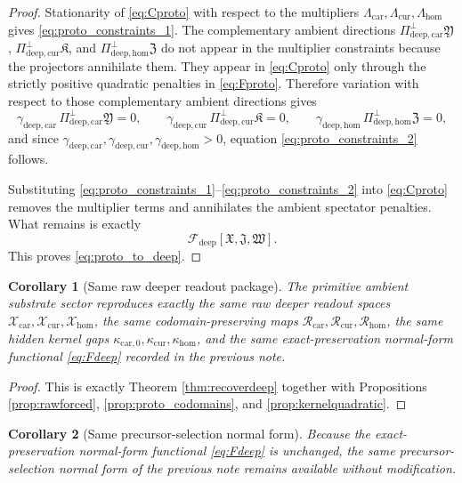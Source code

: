 \documentclass[11pt]{article}
\newcommand{\DeepFunctional}{\mathscr F_{\mathrm{deep}}}
\newcommand{\PreCarGap}{\kappa_{\mathrm{car},0}}
\newcommand{\CurrentGap}{\kappa_{\mathrm{cur}}}
\newcommand{\HomGap}{\kappa_{\mathrm{hom}}}
\newcommand{\DeepTensorClass}{\mathscr X_{\mathrm{car}}}
\newcommand{\DeepRelabelClass}{\mathscr X_{\mathrm{cur}}}
\newcommand{\DeepFreeClass}{\mathscr X_{\mathrm{hom}}}
\newcommand{\DeepTensor}{\mathfrak X}
\newcommand{\DeepRelabel}{\mathfrak J}
\newcommand{\DeepFree}{\mathfrak W}
\newcommand{\CarRead}{\mathcal R_{\mathrm{car}}}
\newcommand{\CurRead}{\mathcal R_{\mathrm{cur}}}
\newcommand{\HomRead}{\mathcal R_{\mathrm{hom}}}
\newcommand{\ProtoTensor}{\mathfrak Y}
\newcommand{\ProtoRelabel}{\mathfrak K}
\newcommand{\ProtoFree}{\mathfrak Z}
\newcommand{\ProtoCarPerp}{\Pi_{\mathrm{deep,car}}^{\perp}}
\newcommand{\ProtoCurPerp}{\Pi_{\mathrm{deep,cur}}^{\perp}}
\newcommand{\ProtoHomPerp}{\Pi_{\mathrm{deep,hom}}^{\perp}}
\newcommand{\ProtoCarGap}{\gamma_{\mathrm{deep,car}}}
\newcommand{\ProtoCurGap}{\gamma_{\mathrm{deep,cur}}}
\newcommand{\ProtoHomGap}{\gamma_{\mathrm{deep,hom}}}
\newtheorem{corollary}{Corollary}
\begin{document}
\begin{proof}
Stationarity of \eqref{eq:Cproto} with respect to the multipliers \(\Lambda_{\mathrm{car}},\Lambda_{\mathrm{cur}},\Lambda_{\mathrm{hom}}\) gives \eqref{eq:proto_constraints_1}. The complementary ambient directions \(\ProtoCarPerp\ProtoTensor\), \(\ProtoCurPerp\ProtoRelabel\), and \(\ProtoHomPerp\ProtoFree\) do not appear in the multiplier constraints because the projectors annihilate them. They appear in \eqref{eq:Cproto} only through the strictly positive quadratic penalties in \eqref{eq:Fproto}. Therefore variation with respect to those complementary ambient directions gives
\[
\ProtoCarGap\,\ProtoCarPerp\ProtoTensor=0,
\qquad
\ProtoCurGap\,\ProtoCurPerp\ProtoRelabel=0,
\qquad
\ProtoHomGap\,\ProtoHomPerp\ProtoFree=0,
\]
and since \(\ProtoCarGap,\ProtoCurGap,\ProtoHomGap>0\), equation \eqref{eq:proto_constraints_2} follows.

Substituting \eqref{eq:proto_constraints_1}--\eqref{eq:proto_constraints_2} into \eqref{eq:Cproto} removes the multiplier terms and annihilates the ambient spectator penalties. What remains is exactly
\[
\DeepFunctional[\DeepTensor,\DeepRelabel,\DeepFree].
\]
This proves \eqref{eq:proto_to_deep}.
\end{proof}

\begin{corollary}[Same raw deeper readout package]
\label{cor:samedeep}
The primitive ambient substrate sector reproduces exactly the same raw deeper readout spaces \(\DeepTensorClass,\DeepRelabelClass,\DeepFreeClass\), the same codomain-preserving maps \(\CarRead,\CurRead,\HomRead\), the same hidden kernel gaps \(\PreCarGap,\CurrentGap,\HomGap\), and the same exact-preservation normal-form functional \eqref{eq:Fdeep} recorded in the previous note.
\end{corollary}

\begin{proof}
This is exactly Theorem \ref{thm:recoverdeep} together with Propositions \ref{prop:rawforced}, \ref{prop:proto_codomains}, and \ref{prop:kernelquadratic}.
\end{proof}

\begin{corollary}[Same precursor-selection normal form]
\label{cor:precursoravailable}
Because the exact-preservation normal-form functional \eqref{eq:Fdeep} is unchanged, the same precursor-selection normal form of the previous note remains available without modification.
\end{corollary}
\end{document}

